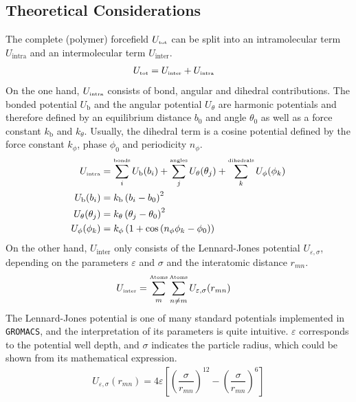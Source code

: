 \documentclass[9pt,tutorial]{livecoms}
\begin{document}
\subsection*{Theoretical Considerations}
The complete (polymer) forcefield $U_\text{\tiny tot}$ can be split into an intramolecular term $U_\text{intra}$ and an intermolecular term $U_\text{inter}$. 
\begin{align}
U_\text{\tiny tot} & =  U_\text{\tiny inter} + U_\text{\tiny intra}
\end{align}
On the one hand, $U_\text{\tiny intra}$ consists of bond, angular and dihedral contributions. The bonded potential $U_\text{b}$ and the angular potential $U_\theta$ are harmonic potentials and therefore defined by an equilibrium distance $b_0$ and angle $\theta_0$ as well as a force constant $k_\text{b}$ and $k_\theta$. Usually, the dihedral term is a cosine potential defined by the force constant $k_\phi$, phase $\phi_0$ and periodicity $n_\phi$.
\begin{align}
U_\text{\tiny intra} & = \sum_{i}^{\text{\tiny bonds}} U_\text{b}(b_i) + \sum_{j}^{\text{\tiny angles}} U_\theta (\theta_j) + \sum_{k}^{\text{\tiny dihedrals}} U_\phi (\phi_k)\\
U_\text{b}(b_i) & = k_\text{b} \left(b_i -b_0\right)^2\\
U_\theta(\theta_j) & = k_\theta \left(\theta_j -\theta_0\right)^2\\
U_\phi(\phi_k) & = k_\phi \left(1 + \cos\left(n_\phi\phi_k - \phi_0\right)\right)
\end{align}
On the other hand, $U_\text{inter}$ only consists of the Lennard-Jones potential $U_{\varepsilon,\sigma}$, depending on the parameters $\varepsilon$ and $\sigma$ and the interatomic distance $r_{mn}$.
\begin{align}
	U_\text{\tiny inter} & = \sum_{m}^{\text{\tiny Atoms}} \sum_{n\neq m}^{\text{\tiny Atoms}} U_{\varepsilon,\sigma}(r_{mn})
\end{align}
The Lennard-Jones potential is one of many standard potentials implemented in \texttt{GROMACS}, and the interpretation of its parameters is quite intuitive. $\varepsilon$ corresponds to the potential well depth, and $\sigma$ indicates the particle radius, which could be shown from its mathematical expression.\cite{LennardJones1924}
\begin{align}\label{eq:lennardJones}
	U_{\varepsilon,\sigma}(r_{mn})= 4 \varepsilon \left [ {\left (\dfrac{\sigma}{r_{mn}} \right )}^{12}-{\left (\dfrac{\sigma}{r_{mn}} \right )}^{6} \right]
\end{align}
\end{document}
